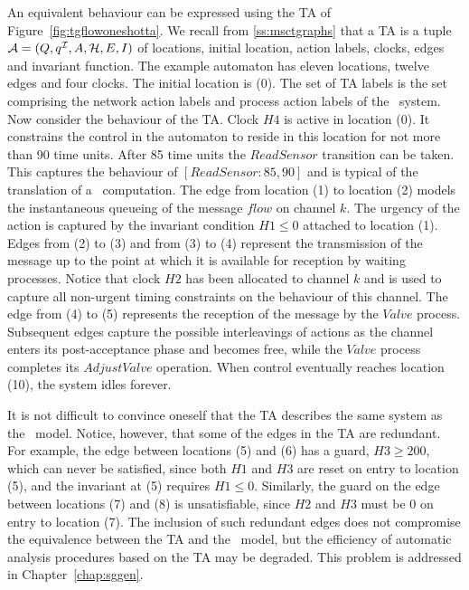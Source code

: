 An equivalent behaviour can be expressed using the TA of
Figure~\ref{fig:tgflowoneshotta}. We recall from \Sec\ref{ss:msctgraphs}
that a TA is a tuple $\AA =
(\tglocs,\tgiloc,\Actions,\tgclks,\tgedges,\tginv)$ of locations,
initial location, action labels, clocks, edges and invariant function.
The example automaton has eleven locations, twelve edges and four
clocks. The initial location is (0). The set of TA labels is the set
comprising the network action labels and process action labels of the
\bcandle\ system.  Now consider the behaviour of the TA. 
Clock $H4$ is active in location (0). It constrains the control in the
automaton to reside in this location for not more than 90 time
units. After 85 time units the $ReadSensor$ transition can be
taken. This captures the behaviour of $[ReadSensor:85,90]$ and is
typical of the translation of a \bcandle\ computation. The edge from
location (1) to location (2) models the instantaneous queueing of the
message $flow$ on channel $k$. The urgency of the action is
captured by the invariant condition $H1 \leq 0$ attached to location
(1). Edges from (2) to (3) and from (3) to (4) represent the
transmission of the message up to the point at which it is available
for reception by waiting processes. Notice that clock $H2$ has been allocated
to channel $k$ and is used to capture all non-urgent timing constraints on
the behaviour of this channel. The edge from (4) to (5) represents the
reception of the message by the $Valve$ process. Subsequent edges
capture the possible interleavings of actions as the channel enters
its post-acceptance phase and becomes free, while the $Valve$ process
completes its $AdjustValve$ operation. When control eventually reaches
location (10), the system idles forever.

It is not difficult to convince oneself that the TA describes the same
system as the \bcandle\ model.  Notice, however, that some of the
edges in the TA are redundant. For example, the edge between locations
(5) and (6) has a guard, $H3 \geq 200$, which can never be satisfied,
since both $H1$ and $H3$ are reset on entry to location (5), and the
invariant at (5) requires $H1 \leq 0$. Similarly, the guard on the
edge between locations (7) and (8) is unsatisfiable, since $H2$ and
$H3$ must be 0 on entry to location (7). The inclusion of such
redundant edges does not compromise the equivalence between the TA and
the \bcandle\ model, but the efficiency of automatic analysis
procedures based on the TA may be degraded. This problem is addressed
in Chapter~\ref{chap:sggen}.

